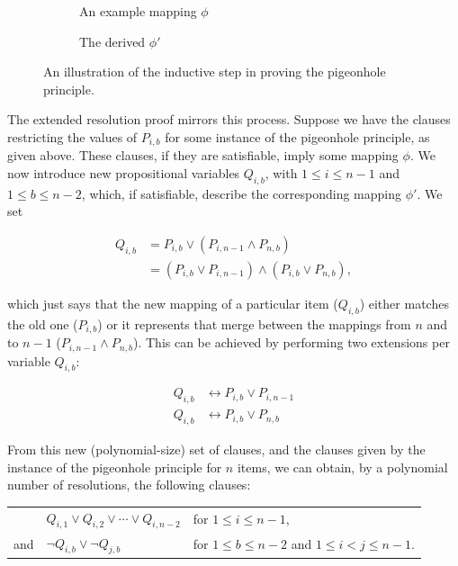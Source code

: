 \documentclass[proof,pdftex,11pt,a4,titlepage]{article}
\begin{document}
\begin{figure}[h]
  \begin{subfigure}[H]{0.5\textwidth}
    
    \caption{An example mapping $\phi$}
  \end{subfigure}
  \begin{subfigure}[H]{0.5\textwidth}
    
    \caption{The derived $\phi'$}
  \end{subfigure}
  \caption{An illustration of the inductive step in proving the pigeonhole principle.}
  \label{fig:php-induction}
\end{figure}

The extended resolution proof mirrors this process. Suppose we have the clauses restricting the values of $P_{i,b}$ for some instance of the pigeonhole principle, as given above. These clauses, if they are satisfiable, imply some mapping $\phi$. We now introduce new propositional variables $Q_{i,b}$, with $1 \leq i \leq n-1$ and $1 \leq b \leq n-2$, which, if satisfiable, describe the corresponding mapping $\phi'$. We set

\begin{equation*}
  \begin{align*}
    Q_{i,b} &= P_{i,b} \vee (P_{i,n-1} \wedge P_{n,b}) \\
      &= (P_{i,b} \vee P_{i,n-1}) \wedge (P_{i,b} \vee P_{n,b}),
  \end{align*}
\end{equation*}

which just says that the new mapping of a particular item ($Q_{i,b}$) either matches the old one ($P_{i,b}$) or it represents that merge between the mappings from $n$ and to $n-1$ ($P_{i,n-1} \wedge P_{n,b}$). This can be achieved by performing two extensions per variable $Q_{i,b}$:

\begin{equation*}
  \begin{align*}
    Q_{i,b} &\leftrightarrow P_{i,b} \vee P_{i,n-1} \\
    Q_{i,b} &\leftrightarrow P_{i,b} \vee P_{n,b}
  \end{align*}
\end{equation*}

From this new (polynomial-size) set of clauses, and the clauses given by the instance of the pigeonhole principle for $n$ items, we can obtain, by a polynomial number of resolutions, the following clauses:

\begin{table}[h]
  \begin{tabular}{rll}
        & $Q_{i,1} \vee Q_{i,2} \vee \cdots \vee Q_{i,n-2}$ & for $1 \leq i \leq n-1$, \\
    and & $\neg Q_{i,b} \vee \neg Q_{j,b}$ & for $1 \leq b \leq n-2$ and $1 \leq i < j \leq n-1$.
  \end{tabular}
\end{table}
\FloatBarrier
\end{document}
